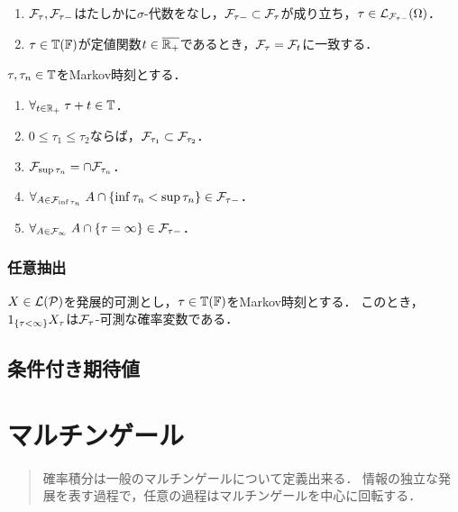 \documentclass[uplatex,dvipdfmx]{jsreport}
\begin{document}
\begin{lemma}\mbox{}
    \begin{enumerate}
        \item $\mathcal{F}_\tau,\mathcal{F}_{\tau-}$はたしかに$\sigma$-代数をなし，$\mathcal{F}_{\tau-}\subset\mathcal{F}_\tau$が成り立ち，$\tau\in\mathcal{L}_{\mathcal{F}_{\tau-}}(\Omega)$．
        \item $\tau\in\mathbb{T}(\mathbb{F})$が定値関数$t\in\overline{\mathbb{R}_+}$であるとき，$\mathcal{F}_\tau=\mathcal{F}_t$に一致する．
    \end{enumerate}
\end{lemma}

\begin{proposition}[Markov時刻の情報系の性質]
    $\tau,\tau_n\in\mathbb{T}$をMarkov時刻とする．
    \begin{enumerate}
        \item $\forall_{t\in\mathbb{R}_+}\;\tau+t\in\mathbb{T}$．
        \item $0\le\tau_1\le\tau_2$ならば，$\mathcal{F}_{\tau_1}\subset\mathcal{F}_{\tau_2}$．
        \item $\mathcal{F}_{\sup\tau_n}=\cap\mathcal{F}_{\tau_n}$．
        \item $\forall_{A\in\mathcal{F}_{\inf\tau_n}}\;A\cap\left\{\inf\tau_n<\sup\tau_n\right\}\in\mathcal{F}_{\tau-}$．
        \item $\forall_{A\in\mathcal{F}_\infty}\;A\cap\left\{\tau=\infty\right\}\in\mathcal{F}_{\tau-}$．
    \end{enumerate}
\end{proposition}

\subsection{任意抽出}

\begin{proposition}
    $X\in\mathcal{L}(\mathcal{P})$を発展的可測とし，$\tau\in\mathbb{T}(\mathbb{F})$をMarkov時刻とする．
    このとき，$1_{\left\{\tau<\infty\right\}}X_\tau$は$\mathcal{F}_\tau$-可測な確率変数である．
\end{proposition}

\section{条件付き期待値}

\chapter{マルチンゲール}

\begin{quotation}
    確率積分は一般のマルチンゲールについて定義出来る．
    情報の独立な発展を表す過程で，任意の過程はマルチンゲールを中心に回転する．
\end{quotation}
\end{document}
